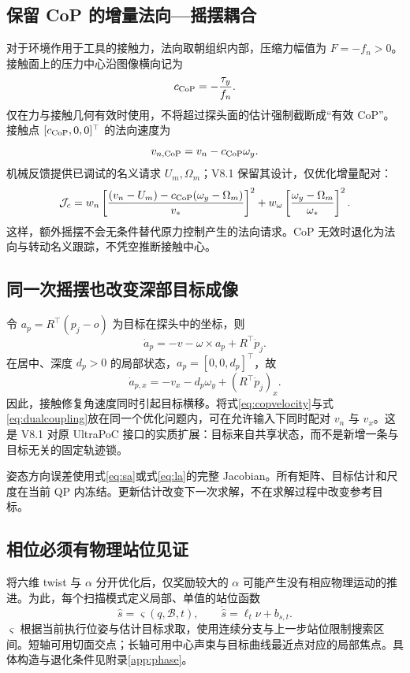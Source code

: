 \documentclass[UTF8,11pt,a4paper,fontset=fandol]{ctexart}
\numberwithin{equation}{section}
\theoremstyle{definition}
\begin{document}
\subsection{保留 CoP 的增量法向—摇摆耦合}
对于环境作用于工具的接触力，法向取朝组织内部，压缩力幅值为 $F=-f_n>0$。接触面上的压力中心沿图像横向记为
\begin{equation}
c_{\rm CoP}=-\frac{\tau_y}{f_n}.
\label{eq:cop}
\end{equation}
仅在力与接触几何有效时使用，不将超过探头面的估计强制截断成“有效 CoP”。接触点 $[c_{\rm CoP},0,0]^\top$ 的法向速度为
\begin{equation}
v_{n,\rm CoP}=v_n-c_{\rm CoP}\omega_y.
\label{eq:copvelocity}
\end{equation}
机械反馈提供已调试的名义请求 $U_m,\Omega_m$；V8.1 保留其设计，仅优化增量配对：
\begin{equation}
\mathcal J_c=
 w_n\left[
\frac{(v_n-U_m)-c_{\rm CoP}(\omega_y-\Omega_m)}{v_*}
\right]^2
+w_\omega\left[\frac{\omega_y-\Omega_m}{\omega_*}\right]^2.
\label{eq:contactcost}
\end{equation}
这样，额外摇摆不会无条件替代原力控制产生的法向请求。CoP 无效时退化为法向与转动名义跟踪，不凭空推断接触中心。

\subsection{同一次摇摆也改变深部目标成像}
令 $a_p=R^\top(p_j-o)$ 为目标在探头中的坐标，则
\begin{equation}
\dot a_p=-v-\omega\times a_p+R^\top\dot p_j.
\label{eq:imagingdynamics}
\end{equation}
在居中、深度 $d_p>0$ 的局部状态，$a_p=[0,0,d_p]^\top$，故
\begin{equation}
\dot a_{p,x}=-v_x-d_p\omega_y+(R^\top\dot p_j)_x.
\label{eq:dualcoupling}
\end{equation}
因此，接触修复角速度同时引起目标横移。将式\eqref{eq:copvelocity}与式\eqref{eq:dualcoupling}放在同一个优化问题内，可在允许输入下同时配对 $v_n$ 与 $v_x$。这是 V8.1 对原 UltraPoC 接口的实质扩展：目标来自共享状态，而不是新增一条与目标无关的固定轨迹锁。

姿态方向误差使用式\eqref{eq:sa}或式\eqref{eq:la}的完整 Jacobian。所有矩阵、目标估计和尺度在当前 QP 内冻结。更新估计改变下一次求解，不在求解过程中改变参考目标。

\subsection{相位必须有物理站位见证}
\label{sec:phase}
将六维 twist 与 $\alpha$ 分开优化后，仅奖励较大的 $\alpha$ 可能产生没有相应物理运动的推进。为此，每个扫描模式定义局部、单值的站位函数
\begin{equation}
\widehat s=\varsigma(q,\mathcal B,t),\qquad
\dot{\widehat s}=\ell_t\nu+b_{s,t}.
\label{eq:station}
\end{equation}
$\varsigma$ 根据当前执行位姿与估计目标求取，使用连续分支与上一步站位限制搜索区间。短轴可用切面交点；长轴可用中心声束与目标曲线最近点对应的局部焦点。具体构造与退化条件见附录\ref{app:phase}。
\end{document}
